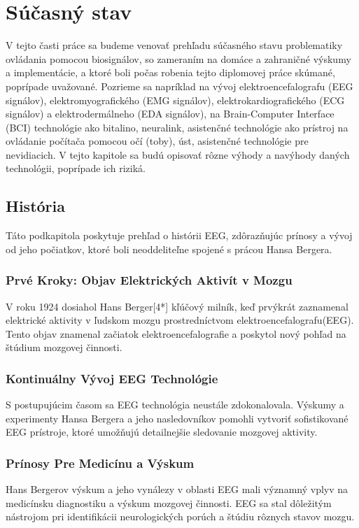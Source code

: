 \chapter{Súčasný stav}

\tab[5 mm] V tejto časti práce sa budeme venovať prehľadu súčasného stavu problematiky ovládania pomocou biosignálov, so zameraním na domáce a zahraničné výskumy a implementácie, a ktoré boli počas robenia tejto diplomovej práce skúmané, poprípade uvažované. Pozrieme sa napríklad na vývoj elektroencefalografu (EEG signálov),  elektromyografického (EMG signálov), elektrokardiografického (ECG signálov) a elektrodermálneho (EDA signálov), na Brain-Computer Interface (BCI) technológie ako bitalino, neuralink, asistenčné technológie ako prístroj na ovládanie počítača pomocou očí (toby), úst, asistenčné technológie pre nevidiacich. V tejto kapitole sa budú opisovať rôzne výhody a navýhody daných technológii, poprípade ich riziká.


\section{História}
\tab[5 mm] Táto podkapitola poskytuje prehľad o histórii EEG, zdôrazňujúc prínosy a vývoj od jeho počiatkov, ktoré boli neoddeliteľne spojené s prácou Hansa Bergera.
\subsection{Prvé Kroky: Objav Elektrických Aktivít v Mozgu}
\tab[5 mm] V roku 1924 dosiahol Hans Berger[4*] kľúčový milník, keď prvýkrát zaznamenal elektrické aktivity v ľudskom mozgu prostredníctvom elektroencefalografu(EEG). Tento objav znamenal začiatok elektroencefalografie a poskytol nový pohľad na štúdium mozgovej činnosti.\\
\subsection{Kontinuálny Vývoj EEG Technológie}
\tab[5 mm] S postupujúcim časom sa EEG technológia neustále zdokonalovala. Výskumy a experimenty Hansa Bergera a jeho nasledovníkov pomohli vytvoriť sofistikované EEG prístroje, ktoré umožňujú detailnejšie sledovanie mozgovej aktivity.
\subsection{Prínosy Pre Medicínu a Výskum}

\tab[5 mm] Hans Bergerov výskum a jeho vynálezy v oblasti EEG mali významný vplyv na medicínsku diagnostiku a výskum mozgovej činnosti. EEG sa stal dôležitým nástrojom pri identifikácii neurologických porúch a štúdiu rôznych stavov mozgu.

